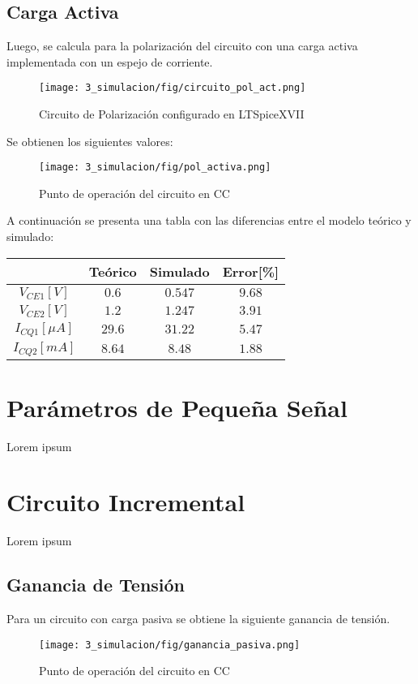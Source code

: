 \subsection{Carga Activa}

Luego, se calcula  para la polarización del circuito con una carga activa implementada con un espejo de corriente.

\begin{figure}[H]
    \centering
    \texttt{[image: 3\_simulacion/fig/circuito\_pol\_act.png]}
    \label{circuito_pol_activa}
    \caption{Circuito de Polarización configurado en LTSpiceXVII}
\end{figure}

Se obtienen los siguientes valores:

\begin{figure}[H]
    \centering
    \texttt{[image: 3\_simulacion/fig/pol\_activa.png]}
    \label{mediciones_pol_activa}
    \caption{Punto de operación del circuito en CC}
\end{figure}
A continuación se presenta una tabla con las diferencias entre el modelo teórico y simulado:

\begin{table}[H]
    \centering
    \begin{tabular}{|c|c|c|c|}
    \hline
                        & Teórico & Simulado & Error[\%] \\ \hline
    $V_{CE1}[V]$        & $0.6$   & $0.547$  & $9.68$    \\ \hline
    $V_{CE2}[V]$        & $1.2$   & $1.247$   & $3.91$   \\ \hline
    $I_{CQ1}[\mu A]$ & $29.6$  & $31.22$  & $5.47$   \\ \hline
    $I_{CQ2}[mA]$ & $8.64$  & $8.48$  & $1.88$   \\ \hline
    \end{tabular}
    \end{table}



\section{Parámetros de Pequeña Señal}
Lorem ipsum
\section{Circuito Incremental}
Lorem ipsum
\subsection{Ganancia de Tensión}
Para un circuito con carga pasiva se obtiene la siguiente ganancia de tensión.
\begin{figure}[H]
    \centering
    \texttt{[image: 3\_simulacion/fig/ganancia\_pasiva.png]}
    \label{mediciones_pol_activa}
    \caption{Punto de operación del circuito en CC}
\end{figure}


